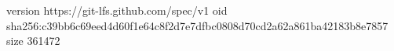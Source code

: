 version https://git-lfs.github.com/spec/v1
oid sha256:c39bb6c69eed4d60f1e64c8f2d7e7dfbc0808d70cd2a62a861ba42183b8e7857
size 361472
